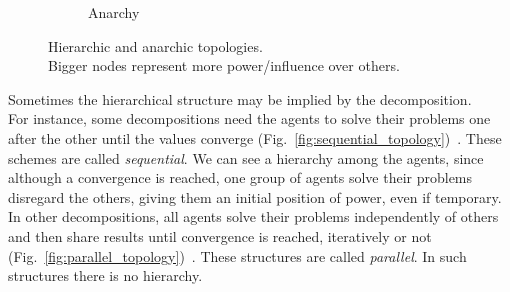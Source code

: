 \documentclass[../main.tex]{subfiles}
\begin{document}
\begin{figure}[H]
\begin{subfigure}[b]{.45\textwidth}
{
  }
  \caption{Anarchy}\label{fig:anarchy_topology}
\end{subfigure}
\caption[Hierarchic and anarchic topologies.]{Hierarchic and anarchic topologies. \\Bigger nodes represent more power/influence over others.}\label{fig:hierarchic_anarchic}
\end{figure}


Sometimes the hierarchical structure may be implied by the decomposition.
\\For instance, some decompositions need the agents to solve their problems one after the other until the values converge (Fig.~\ref{fig:sequential_topology})~\cite{LiuEtAl2009a}.
These schemes are called \emph{sequential}.
We can see a hierarchy among the agents, since although a convergence is reached, one group of agents solve their problems disregard the others, giving them an initial position of power, even if temporary.
\\In other decompositions, all agents solve their problems independently of others and then share results until convergence is reached, iteratively or not (Fig.~\ref{fig:parallel_topology})~\cite{LiuEtAl2010}.
These structures are called \emph{parallel}.
In such structures there is no hierarchy.
\end{document}
